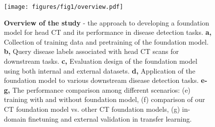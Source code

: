\begin{figure}[htbp]
    \centering
    \texttt{[image: figures/fig1/overview.pdf]}
    \caption{\textbf{Overview of the study} - the approach to developing a foundation model for head CT and its performance in disease detection tasks. \textbf{a,} Collection of training data and pretraining of the foundation model. \textbf{b,} Query disease labels associated with head CT scans for downstream tasks. \textbf{c,} Evaluation design of the foundation model using both internal and external datasets. \textbf{d,} Application of the foundation model to various downstream disease detection tasks. \textbf{e-g,} The performance comparison among different scenarios: (e) training with and without foundation model, (f) comparison of our CT foundation model vs. other CT foundation models, (g) in-domain finetuning and external validation in transfer learning.}
    \label{fig:overview}
\end{figure}


